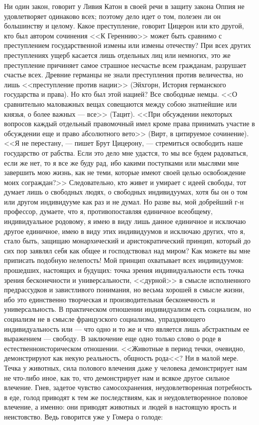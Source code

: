 \documentclass[12pt]{article}
\begin{document}
Ни один закон, говорит у Ливия Катон в своей речи в защиту закона Оппия не удовлетворяет одинаково всех; поэтому дело идет о том, полезен ли он большинству и целому. Какое преступление, говорит Цицерон или кто другой, кто был автором сочинения <<К Гереннию>>  может быть сравнимо с преступлением государственной измены или измены отечеству? При всех других преступлениях ущерб касается лишь отдельных лиц или немногих, это же преступление причиняет самое страшное несчастье всем гражданам, разрушает счастье всех. Древние германцы не знали преступления против величества, но лишь <<преступление против нации>> (Эйхгорн, История германского государства и права). Но кто был этой нацией? Все свободные немцы. <<О сравнительно маловажных вещах совещаются между собою знатнейшие или князья, о более важных --- все>> (Тацит). <<При обсуждении некоторых вопросов каждый отдельный правомочный имел кроме права принимать участие в обсуждении еще и право абсолютного вето>> (Вирт, в цитируемое сочинение). <<Я не перестану, --- пишет Брут Цицерону, --- стремиться освободить наше государство от рабства. Если это дело мне удастся, то мы все будем радоваться, если же нет, то я все же буду рад, ибо какими поступками или мыслями мне завершить мою жизнь, как не теми, которые имеют своей целью освобождение моих сограждан?>> Следовательно, кто живет и умирает с идеей свободы, тот думает лишь о свободных людях, о свободных индивидуумах, хотя бы он о том или другом индивидууме как раз и не думал. Но разве вы, мой добрейший г-н профессор, думаете, что я, противопоставляя единичное всеобщему, индивидуальное родовому, я имею в виду лишь данное единичное и исключаю другое единичное, имею в виду этих индивидуумов и исключаю других, что я, стало быть, защищаю монархический и аристократический принцип, который до сих пор заявлял себя как общее и господствовал над миром? Как можете вы мне приписать подобную нелепость! Мой принцип охватывает всех индивидуумов: прошедших, настоящих и будущих: точка зрения индивидуальности есть точка зрения бесконечности и универсальности, <<дурной>> в смысле исполненного предрассудков и завистливого понимания, но весьма хорошей в смысле жизни, ибо это единственно творческая и производительная бесконечность и универсальность. В практическом отношении индивидуализм есть социализм, но социализм не в смысле французского социализма, упраздняющего индивидуальность или --- что одно и то же и что является лишь абстрактным ее выражением --- свободу. В заключение еще одно только слово о роде в естественноисторическом отношении. <<Животные в период течки, очевидно, демонстрируют как некую реальность, общность рода<<? Ни в малой мере. Течка у животных, сила полового влечения даже у человека демонстрирует нам не что-либо иное, как то, что демонстрирует нам и всякое другое сильное влечение. Гнев, задетое чувство самосохранения, неудовлетворенная потребность в еде, голод приводят к тем же последствиям, как и неудовлетворенное половое влечение, а именно: они приводят животных и людей в настоящую ярость и неистовство. Ведь говорится уже у Гомера о голоде: 
\end{document}
